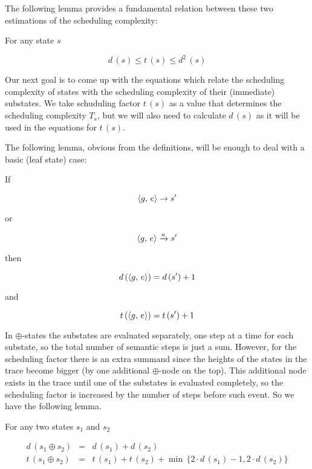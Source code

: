 The following lemma provides a fundamental relation between these two estimations of the scheduling complexity:

\begin{lemma}
  For any state $s$

  \[
  d\,(s) \le t\,(s) \le d^2\,(s)
  \]
  
\end{lemma}

Our next goal is to come up with the equations which relate the scheduling complexity of states with the scheduling complexity of their
(immediate) substates. We take schuduling factor $t\,(s)$ as a value that determines the scheduling complexity $T_s$, but we will also need to calculate $d\,(s)$ as it will be used in the equations for $t\,(s)$. 

The following lemma, obvious from the definitions, will be enough to deal with a basic (leaf state) case:

\begin{lemma}
  If

  \[\langle g ,\, e \rangle \rightarrow s^\prime\]

  or

  \[\langle g ,\, e \rangle \xrightarrow{a} s^\prime\]

  then

  \[d\,(\langle g ,\, e \rangle) = d\,(s^\prime) + 1\]

  and

  \[t\,(\langle g ,\, e \rangle) = t\,(s^\prime) + 1\]
\end{lemma}

In $\oplus$-states the substates are evaluated separately, one step at a time for each substate, so the total number of semantic steps is just a sum. However, for the scheduling factor there is an
extra summand since the heights of the states in the trace become bigger (by one additional $\oplus$-node on the top). This additional node exists in the trace until one of the substates is
evaluated completely, so the scheduling factor is increased by the number of steps before such event. So we have the following lemma.

\begin{lemma}
\label{lem:sum_estimation}
For any two states $s_1$ and $s_2$

\[
\begin{array}{rcl}
  d\,(s_1 \oplus s_2) &=& d\,(s_1) + d\,(s_2) \\

  t\,(s_1 \oplus s_2) &=& t\,(s_1) + t\,(s_2) + \min\,\{2\cdot d\,(s_1) - 1, 2\cdot d\,(s_2)\}
\end{array}
\]

\end{lemma}

